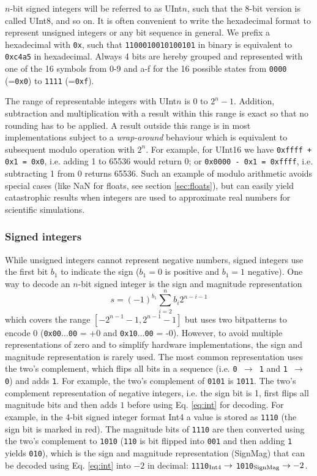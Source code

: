 $n$-bit signed integers will be referred to as UInt$n$, such that the 8-bit version is called UInt8, and so on. It is often convenient to
write the hexadecimal format to represent unsigned integers or any bit sequence in general. We prefix a hexadecimal with
\texttt{0x}, such that \texttt{1100010010100101} in binary is equivalent to \texttt{0xc4a5} in hexadecimal. Always 4 bits are hereby
grouped and represented with one of the 16 symbols from 0-9 and a-f for the 16 possible states from \texttt{0000} (=\texttt{0x0})
to \texttt{1111} (=\texttt{0xf}).

The range of representable integers with UInt$n$ is 0 to $2^n-1$. Addition, subtraction and multiplication with a result within this
range is exact so that no rounding has to be applied. A result outside this range is in most implementations subject to a \emph{wrap-around}
behaviour which is equivalent to subsequent modulo operation with $2^n$. For example, for UInt16 we have \texttt{0xffff + 0x1 = 0x0}, i.e.
adding 1 to 65536 would return 0; or \texttt{0x0000 - 0x1 = 0xffff}, i.e. subtracting 1 from 0 returns 65536. Such an example of modulo
arithmetic avoids special cases (like NaN for floats, see section \ref{sec:floats}), but can easily yield catastrophic results when integers
are used to approximate real numbers for scientific simulations.

\subsubsection{Signed integers}
While unsigned integers cannot represent negative numbers, signed integers use the first bit $b_1$ to indicate the sign ($b_1 = 0$ is
positive and $b_1 = 1$ negative). One way to decode an $n$-bit signed integer is the sign and magnitude representation
\begin{equation}
	s = (-1)^{b_1}\sum_{i=2}^{n} b_i 2^{n-i-1}
	\label{eq:int}
\end{equation}
which covers the range $[-2^{n-1}-1,2^{n-1}-1]$ but uses two bitpatterns to encode 0 (\texttt{0x00$\dots$00} = +0 and \texttt{0x10$\dots$00} = -0).
However, to avoid multiple representations of zero and to simplify hardware implementations, the sign and magnitude representation
is rarely used. The most common representation uses the two's complement, which flips all bits in a sequence (i.e. \texttt{0 $\to$ 1} and \texttt{1 $\to$ 0})
and adds \texttt{1}. For example, the two's complement of \texttt{0101} is \texttt{1011}. The two's complement representation of negative
integers, i.e. the sign bit is 1, first flips all magnitude bits and then adds $1$ before using Eq. \ref{eq:int} for decoding. For example,
in the 4-bit signed integer format Int4 a value is stored as \texttt{{\color{psign}1}110} (the sign bit is marked in red). The magnitude bits of
\texttt{{\color{psign}1}110} are then converted using the two's complement to \texttt{{\color{psign}1}010} (\texttt{110} is bit flipped into \texttt{001}
and then adding \texttt{1} yields \texttt{010}), which is the sign and magnitude representation (SignMag) that can be decoded using Eq. \ref{eq:int}
into $-2$ in decimal: \texttt{{\color{psign}1}110}$_{\operatorname{Int4}} \to$ \texttt{{\color{psign}1}010}$_{\operatorname{SignMag}} \to -2$. 

